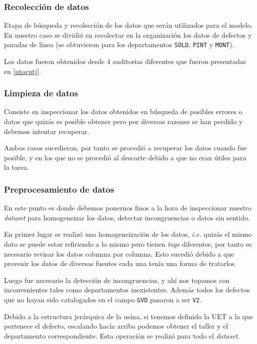 \documentclass[a4paper,12pt]{article}
\begin{document}
\subsubsection{Recolección de datos}
Etapa de búsqueda y recolección de los datos que serán utilizados para el modelo. En nuestro caso se dividió en recolectar en la organización los datos de defectos y paradas de línea (se obtuvieron para los departamentos \texttt{SOLD}, \texttt{PINT} y \texttt{MONT}).

Los datos fueron obtenidos desde 4 auditorias diferentes que fueron presentadas en \ref{ptocptj}.

\subsubsection{Limpieza de datos}
Consiste en inspeccionar los datos obtenidos en búsqueda de posibles errores o datos que quizás es posible obtener pero por diversas razones se han perdido y debemos intentar recuperar.

Ambos casos sucedieron, por tanto se procedió a recuperar los datos cuando fue posible, y en los que no se procedió al descarte debido a que no eran útiles para la tarea.

\subsubsection{Preprocesamiento de datos}

En este punto es donde debemos ponernos finos a la hora de inspeccionar nuestro \textit{dataset} para homogeneizar los datos, detectar incongruencias o datos sin sentido.

En primer lugar se realizó una homogeneización de los datos, \textit{i.e.} quizás el mismo dato se puede estar refiriendo a lo mismo pero tienen \textit{tags} diferentes, por tanto es necesario revisar los datos columna por columna. Esto sucedió debido a que provenir los datos de diversas fuentes cada una tenía una forma de tratarlos. 

Luego fue necesario la detección de incongruencias, y ahí nos topamos con inconvenientes tales como departamentos inexistentes. Además todos los defectos que no hayan sido catalogados en el campo \texttt{GVD} pasaron a ser \texttt{V2}.

Debido a la estructura jerárquica de la usina, si tenemos definido la UET a la que pertenece el defecto, escalando hacía arriba podemos obtener el taller y el departamento correspondiente. Esta operación se realizó para todo el \textit{dataset}.
\end{document}
